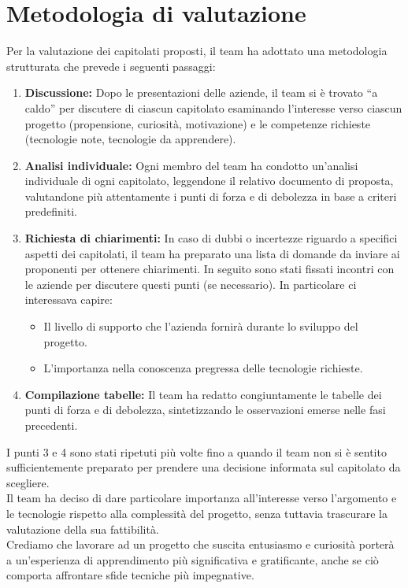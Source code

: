 \documentclass[a4paper,11pt]{article}
\begin{document}

\newpage
\tableofcontents

\newpage
\section{Metodologia di valutazione}
Per la valutazione dei capitolati proposti, il team ha adottato una metodologia strutturata che prevede i seguenti passaggi:
\begin{enumerate}
\item \textbf{Discussione:} Dopo le presentazioni delle aziende, il team si è trovato ``a caldo'' per discutere di ciascun capitolato esaminando l'interesse verso ciascun progetto (propensione, curiosità, motivazione) e le competenze richieste (tecnologie note, tecnologie da apprendere).
\item \textbf{Analisi individuale:} Ogni membro del team ha condotto un'analisi individuale di ogni capitolato, leggendone il relativo documento di proposta, valutandone più attentamente i punti di forza e di debolezza in base a criteri predefiniti.
\item \textbf{Richiesta di chiarimenti:} In caso di dubbi o incertezze riguardo a specifici aspetti dei capitolati, il team ha preparato una lista di domande da inviare ai proponenti per ottenere chiarimenti. In seguito sono stati fissati incontri con le aziende per discutere questi punti (se necessario).
  In particolare ci interessava capire:
  \begin{itemize}
    \item Il livello di supporto che l'azienda fornirà durante lo sviluppo del progetto.
    \item L'importanza nella conoscenza pregressa delle tecnologie richieste.
  \end{itemize}
\item \textbf{Compilazione tabelle:} Il team ha redatto congiuntamente le tabelle dei punti di forza e di debolezza, sintetizzando le osservazioni emerse nelle fasi precedenti.
\end{enumerate}
I punti 3 e 4 sono stati ripetuti più volte fino a quando il team non si è sentito sufficientemente preparato per prendere una decisione informata sul capitolato da scegliere.\\
Il team ha deciso di dare particolare importanza all'interesse verso l'argomento e le tecnologie rispetto alla complessità del progetto, senza tuttavia trascurare la valutazione della sua fattibilità.\\
Crediamo che lavorare ad un progetto che suscita entusiasmo e curiosità porterà a un'esperienza di apprendimento più significativa e gratificante, anche se ciò comporta affrontare sfide tecniche più impegnative.
\end{document}
